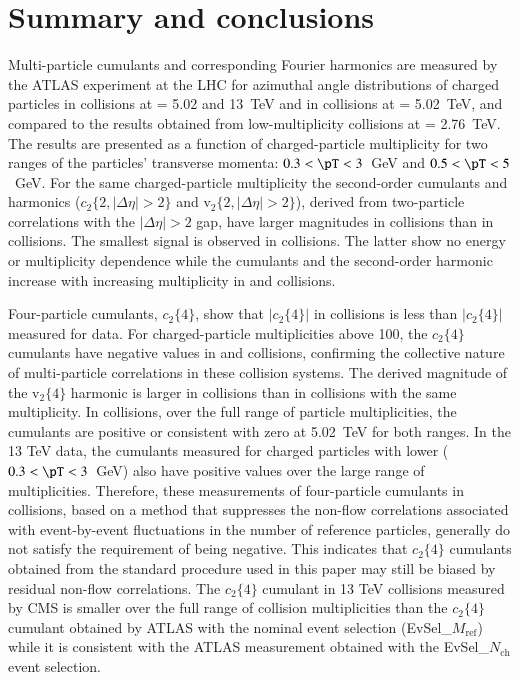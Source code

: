 \documentclass[cernpreprint,texlive=2014,txfonts,UKenglish]{latex/atlasdoc}
\begin{document}
\section{Summary and conclusions}
\label{sec:conclusion}
Multi-particle cumulants and corresponding Fourier harmonics are measured by the ATLAS experiment at the LHC for azimuthal angle distributions of charged particles in \pp collisions at \sqs = 5.02 and 13~TeV and in \pPb collisions at \sqn = 5.02~TeV, and compared to the results obtained from low-multiplicity \PbPb collisions at \sqn = 2.76~TeV. The results are presented as a function of charged-particle multiplicity for two ranges of the particles' transverse momenta: $0.3 < \pT < 3$~GeV and $0.5 < \pT < 5$~GeV. For the same charged-particle multiplicity the second-order cumulants and harmonics ($c_2\{2,|\Delta\eta|>2\}$ and $\mathrm{v}_2\{2,|\Delta\eta|>2\}$), derived from two-particle correlations with the $|\Delta\eta|>2$ gap, have larger magnitudes in \PbPb collisions than in \pPb collisions. The smallest signal is observed in \pp collisions. The latter show no energy or multiplicity dependence while the cumulants and the second-order harmonic increase  with increasing multiplicity in  \pPb and \PbPb collisions. 

Four-particle cumulants, $c_2\{4\}$, show that $|c_2\{4\}|$ in \pPb collisions is less than 
$ |c_2\{4\}|$ measured for \PbPb data. For charged-particle multiplicities above 100, the $c_2\{4\}$ cumulants have negative values in  \pPb and \PbPb collisions, confirming the collective nature of multi-particle correlations in these collision systems. The derived magnitude of the $\mathrm{v}_2\{4\}$ harmonic is larger in \PbPb collisions than in \pPb collisions with the same multiplicity. In \pp collisions, over the full range of particle multiplicities, the cumulants are positive or consistent with zero at 5.02~TeV for both \pT ranges. In the 13 TeV \pp data, the cumulants measured for charged particles with lower \pT ($0.3 < \pT < 3$~GeV) also have positive values over the large range of multiplicities. Therefore, these measurements of four-particle cumulants in \pp collisions, based on a method that suppresses the non-flow correlations associated with event-by-event fluctuations in the number of reference particles, generally do not satisfy the requirement of being negative. This indicates that  $c_2\{4\}$ cumulants obtained from the
standard procedure used in this paper may still be biased by residual non-flow correlations. The $c_2\{4\}$ cumulant in 13 TeV \pp collisions measured by CMS is smaller over the full range of collision multiplicities than the $c_2\{4\}$ cumulant obtained by ATLAS with the nominal event selection (EvSel\_$M_{\mathrm{ref}}$) while it is consistent with the ATLAS measurement obtained with the EvSel\_$N_{\mathrm{ch}}$ event selection. 
\end{document}
